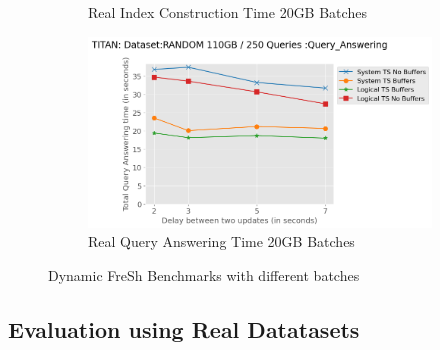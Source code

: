 \begin{figure}
\begin{subfigure}[c]{0.45\textwidth}
		\caption{Real Index Construction Time 20GB Batches}
		\label{fig:actual-index-Construction-time-20GB}
	\end{subfigure}
	\begin{subfigure}[c]{0.45\textwidth}
		\includegraphics[width=1\textwidth]	 {figures/Experiments/Dynamic/20GB/dataset_115343360_lockfree_Messi_Results_query_answering_initial[10485760]_delays_20GB.png}
		\caption{Real Query Answering Time 20GB Batches}
		\label{fig:actual-query-answering-time-20GB}
	\end{subfigure}
	\caption{Dynamic FreSh Benchmarks with different batches}
	\label{fig:dfresh-fresh-random-different-batches}
\end{figure}


\clearpage
\subsection{Evaluation using Real Datatasets}